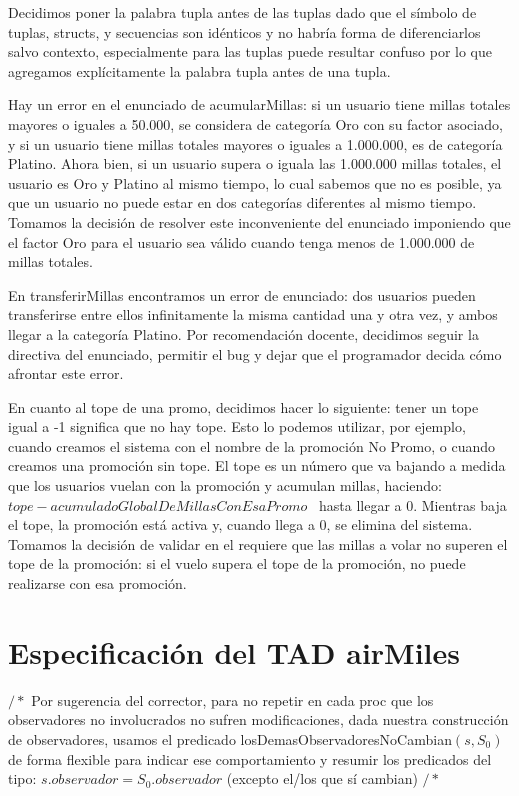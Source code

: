 \documentclass[11pt,a4paper]{article}
\begin{document}
Decidimos poner la palabra tupla antes de las tuplas dado que el símbolo de tuplas, structs, y secuencias son idénticos y no habría forma de diferenciarlos salvo contexto, especialmente para las tuplas puede resultar confuso por lo que agregamos explícitamente la palabra tupla antes de una tupla.

Hay un error en el enunciado de acumularMillas: si un usuario tiene millas totales mayores o iguales a 50.000, se considera de categoría Oro con su factor asociado, y si un usuario tiene millas totales mayores o iguales a 1.000.000, es de categoría Platino. Ahora bien, si un usuario supera o iguala las 1.000.000 millas totales, el usuario es Oro y Platino al mismo tiempo, lo cual sabemos que no es posible, ya que un usuario no puede estar en dos categorías diferentes al mismo tiempo. Tomamos la decisión de resolver este inconveniente del enunciado imponiendo que el factor Oro para el usuario sea válido cuando tenga menos de 1.000.000 de millas totales.

En transferirMillas encontramos un error de enunciado: dos usuarios pueden transferirse entre ellos infinitamente la misma cantidad una y otra vez, y ambos llegar a la categoría Platino. Por recomendación docente, decidimos seguir la directiva del enunciado, permitir el bug y dejar que el programador decida cómo afrontar este error.

En cuanto al tope de una promo, decidimos hacer lo siguiente: tener un tope igual a -1 significa que no hay tope. Esto lo podemos utilizar, por ejemplo, cuando creamos el sistema con el nombre de la promoción No Promo, o cuando creamos una promoción sin tope. El tope es un número que va bajando a medida que los usuarios vuelan con la promoción y acumulan millas, haciendo: $tope - acumuladoGlobalDeMillasConEsaPromo$ \ hasta llegar a 0. Mientras baja el tope, la promoción está activa y, cuando llega a 0, se elimina del sistema. Tomamos la decisión de validar en el requiere que las millas a volar no superen el tope de la promoción: si el vuelo supera el tope de la promoción, no puede realizarse con esa promoción.

\section{Especificación del TAD airMiles}

$/*$ Por sugerencia del corrector, para no repetir en cada proc que los observadores no involucrados no sufren modificaciones, dada nuestra construcción de observadores, usamos el predicado losDemasObservadoresNoCambian$(s,S_0)$ de forma flexible para indicar ese comportamiento y resumir los predicados del tipo: $s.observador = S_0.observador$ (excepto el/los que sí cambian) $/*$
\end{document}
